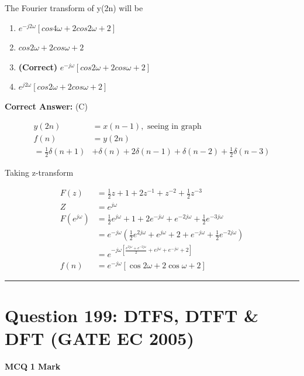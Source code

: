 \documentclass[11pt,a4paper]{article}
\begin{document}
 The Fourier transform of y(2n) will be


\begin{enumerate}[label=(\Alph*)]
    \item $e^{-j2\omega }[cos4\omega +2cos2\omega +2]$
    \item $cos2\omega +2cos\omega +2$
    \item \textbf{(Correct)} $e^{-j\omega }[cos2\omega +2cos\omega +2]$
    \item $e^{j2\omega }[cos2\omega +2cos \omega +2]$
\end{enumerate}

\noindent \textbf{Correct Answer:} (C)

\begin{tcolorbox}[solbox, title=Detailed Solution -- Question 198]
\[
\begin{aligned} y(2 n)&=x(n-1),\text{ seeing in graph}\\ f(n) &=y(2 n) \\ = \frac{1}{2} \delta(n+1)&+\delta(n)+2 \delta(n-1)+\delta(n-2)+\frac{1}{2} \delta(n-3) \end{aligned}
\]

 Taking z-transform

\[
\begin{aligned} F(z)&=\frac{1}{2} z+1+2 z^{-1}+z^{-2}+\frac{1}{2} z^{-3} \\ Z &=e^{j \omega} \\ F\left(e^{j \omega}\right) &=\frac{1}{2} e^{j \omega}+1+2 e^{-j \omega}+e^{-2 j \omega}+\frac{1}{2} e^{-3 j \omega} \\ &=e^{-j \omega}\left(\frac{1}{2} e^{2 j \omega}+e^{j \omega}+2+e^{-j \omega}+\frac{1}{2} e^{-2 j \omega}\right) \\ &=e^{-j \omega\left[\frac{e^{2 j \omega}+e^{-2 j \omega}}{2}+e^{j \omega}+e^{-j \omega}+2\right]} \\ f(n) &=e^{-j \omega}[\cos 2 \omega+2 \cos \omega+2] \end{aligned}
\]
\end{tcolorbox}

\vspace{1.5em}
\hrule
\vspace{1.5em}

\section*{Question 199: DTFS, DTFT \& DFT (GATE EC 2005)}
\noindent \textbf{\color{primary}MCQ} \hfill \textbf{\color{secondary}1 Mark}
\end{document}
